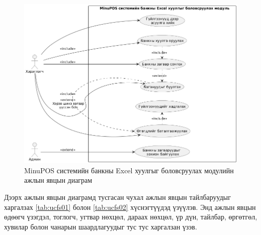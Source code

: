   
  

\begin{figure}[h]
		\centering
		\includegraphics[width=17cm]{images/module_usecase.png}
		\caption{MinuPOS системийн банкны Excel хуулгыг боловсруулах модулийн ажлын явцын диаграм}
		\label{fig:module_usecase}
\end{figure}

Дээрх ажлын явцын диаграмд тусгасан чухал ажлын явцын тайлбаруудыг харгалзах \ref{tab:ucfs01} болон \ref{tab:ucfs02} хүснэгтүүдэд үзүүлэв. Энд ажлын явцын өдөөгч үзэгдэл, тоглогч, угтвар нөхцөл, дараах нөхцөл, үр дүн, тайлбар, өргөтгөл, хувилар болон чанарын шаардлагуудыг тус тус харгалзан үзэв.


